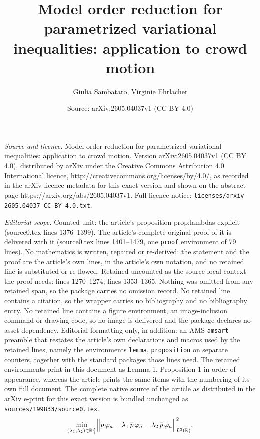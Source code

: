 \documentclass[10pt,a4paper]{amsart}
\title{Model order reduction for parametrized variational inequalities: application to crowd motion}
\author{Giulia Sambataro, Virginie Ehrlacher}
\date{Source: arXiv:2605.04037v1 (CC BY 4.0)}
\begin{document}
\maketitle

\noindent\emph{Source and licence.} Model order reduction for parametrized variational inequalities: application to crowd motion. Version arXiv:2605.04037v1 (CC BY 4.0), distributed by arXiv under the Creative Commons Attribution 4.0 International licence, http://creativecommons.org/licenses/by/4.0/, as recorded in the arXiv licence metadata for this exact version and shown on the abstract page https://arxiv.org/abs/2605.04037v1. Full licence notice: \texttt{licenses/arxiv-2605.04037-CC-BY-4.0.txt}.\par\smallskip

\noindent\textit{Editorial scope.} Counted unit: the article's proposition prop:lambdas-explicit (source0.tex lines 1376--1399). The article's complete original proof of it is delivered with it (source0.tex lines 1401--1479, one \texttt{proof} environment of 79 lines). No mathematics is written, repaired or re-derived: the statement and the proof are the article's own lines, in the article's own notation, and no retained line is substituted or re-flowed.  Retained uncounted as the source-local context the proof needs: lines 1270--1274; lines 1353--1365.  Nothing was omitted from any retained span, so the package carries no omission record.  No retained line contains a citation, so the wrapper carries no bibliography and no bibliography entry.  No retained line contains a figure environment, an image-inclusion command or drawing code, so no image is delivered and the package declares no asset dependency.  Editorial formatting only, in addition: an AMS \texttt{amsart} preamble that restates the article's own declarations and macros used by the retained lines, namely the environments \texttt{lemma}, \texttt{proposition} on separate counters, together with the standard packages those lines need.  The retained environments print in this document as Lemma 1, Proposition 1 in order of appearance, whereas the article prints the same items with the numbering of its own full document.  The complete native source of the article as distributed in the arXiv e-print for this exact version is bundled unchanged as \texttt{sources/199833/source0.tex}.
\begin{equation}\label{eq:minimisation}
\min_{(\lambda_1,\lambda_2)\in\mathbb{R}_+^2}
\Bigl\|p\,\varphi_a-\lambda_1\,\overline{p}\,\varphi_{\overline{a}}
-\lambda_2\,\overline{p}\,\varphi_{\underline{a}}\Bigr\|_{L^2(\mathbb{R})}^2,
\end{equation}
\end{document}
